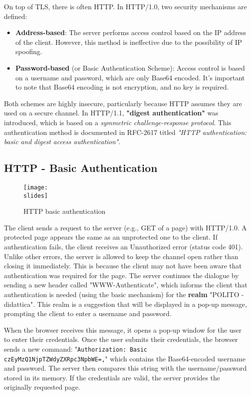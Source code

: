 On top of TLS, there is often HTTP. In HTTP/1.0, two security mechanisms are defined:

\begin{itemize}
    \item \textbf{Address-based}: The server performs access control based on the IP address of the client. However, this method is ineffective due to the possibility of IP spoofing.

    \item \textbf{Password-based} (or Basic Authentication Scheme): Access control is based on a username and password, which are only Base64 encoded. It's important to note that Base64 encoding is not encryption, and no key is required.
\end{itemize}

Both schemes are highly insecure, particularly because HTTP assumes they are used on a secure channel. In HTTP/1.1, \textbf{"digest authentication"} was introduced, which is based on a \textit{symmetric challenge-response protocol}. This authentication method is documented in RFC-2617 titled \textit{"HTTP authentication: basic and digest access authentication"}.


\subsection{HTTP - Basic Authentication}

\begin{figure}[h]
    \centering
    \texttt{[image: \\slides]}
    \caption{HTTP basic authentication}
\end{figure}

The client sends a request to the server (e.g., GET of a page) with HTTP/1.0. A protected page appears the same as an unprotected one to the client. If authentication fails, the client receives an Unauthorized error (status code 401). Unlike other errors, the server is allowed to keep the channel open rather than closing it immediately. This is because the client may not have been aware that authentication was required for the page. The server continues the dialogue by sending a new header called "WWW-Authenticate", which informs the client that authentication is needed (using the basic mechanism) for the \textbf{realm} "POLITO - didattica". This realm is a suggestion that will be displayed in a pop-up message, prompting the client to enter a username and password.

When the browser receives this message, it opens a pop-up window for the user to enter their credentials. Once the user submits their credentials, the browser sends a new command: "\texttt{Authorization: Basic czEyMzQ1NjpTZWdyZXRpc3NpbWE=,}" which contains the Base64-encoded username and password. The server then compares this string with the username/password stored in its memory. If the credentials are valid, the server provides the originally requested page.

